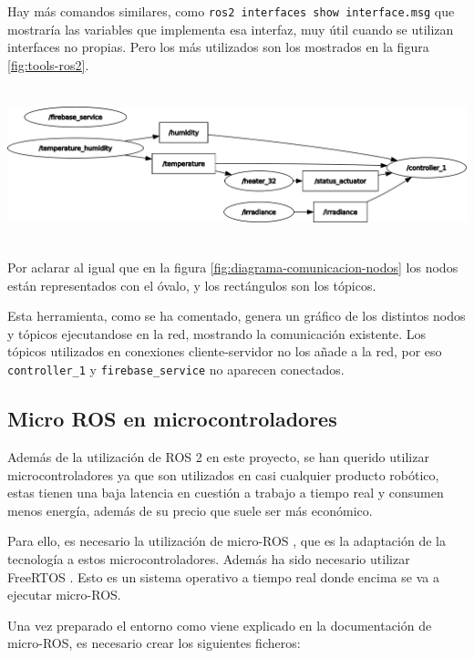 Hay más comandos similares, como \verb|ros2 interfaces show interface.msg| que mostraría las variables que implementa esa interfaz, muy útil cuando se utilizan interfaces no propias. Pero los más utilizados son los mostrados en la figura \ref{fig:tools-ros2}.

 \begin{center}
    \centering
    \includegraphics[width=\textwidth, height=4.5cm]{img/06-Rosgraph.png}
    \label{fig:rqt-graphs}
\end{center}

Por aclarar al igual que en la figura \ref{fig:diagrama-comunicacion-nodos} los nodos están representados con el óvalo, y los rectángulos son los tópicos.

Esta herramienta, como se ha comentado, genera un gráfico de los distintos nodos y tópicos ejecutandose en la red, mostrando la comunicación existente. Los tópicos utilizados en conexiones cliente-servidor no los añade a la red, por eso \verb|controller_1| y \verb|firebase_service| no aparecen conectados.


\subsection{Micro ROS en microcontroladores}

Además de la utilización de ROS 2 en este proyecto, se han querido utilizar microcontroladores ya que son utilizados en casi cualquier producto robótico, estas tienen una baja latencia en cuestión a trabajo a tiempo real y consumen menos energía, además de su precio que suele ser más económico.

Para ello, es necesario la utilización de micro-ROS \cite{micro-ros}, que es la adaptación de la tecnología a estos microcontroladores. Además ha sido necesario utilizar FreeRTOS \cite{free-rtos}. Esto es un sistema operativo a tiempo real donde encima se va a ejecutar micro-ROS.

Una vez preparado el entorno como viene explicado en la documentación de micro-ROS, es necesario crear los siguientes ficheros:


